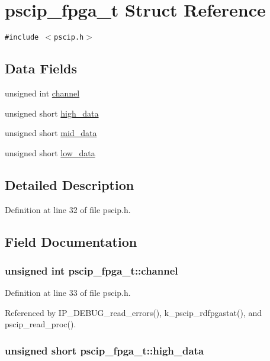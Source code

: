 \hypertarget{structpscip__fpga__t}{
\section{pscip\_\-fpga\_\-t Struct Reference}
\label{structpscip__fpga__t}
}
{\tt \#include $<$pscip.h$>$}

\subsection*{Data Fields}
\begin{CompactItemize}
\item 
unsigned int \hyperlink{structpscip__fpga__t_687f273118bfd092b2736c0a10d0a68d}{channel}
\item 
unsigned short \hyperlink{structpscip__fpga__t_4e50742f45d250be304cd21ad45814ce}{high\_\-data}
\item 
unsigned short \hyperlink{structpscip__fpga__t_89ede1d1b972a6599fee27626c83c6aa}{mid\_\-data}
\item 
unsigned short \hyperlink{structpscip__fpga__t_ab01ca33bd95494de31b58df20fd9d48}{low\_\-data}
\end{CompactItemize}


\subsection{Detailed Description}


Definition at line 32 of file pscip.h.

\subsection{Field Documentation}
\hypertarget{structpscip__fpga__t_687f273118bfd092b2736c0a10d0a68d}{
\subsubsection[{channel}]{\setlength{\rightskip}{0pt plus 5cm}unsigned int {\bf pscip\_\-fpga\_\-t::channel}}}
\label{structpscip__fpga__t_687f273118bfd092b2736c0a10d0a68d}




Definition at line 33 of file pscip.h.

Referenced by IP\_\-DEBUG\_\-read\_\-errors(), k\_\-pscip\_\-rdfpgastat(), and pscip\_\-read\_\-proc().\hypertarget{structpscip__fpga__t_4e50742f45d250be304cd21ad45814ce}{
\subsubsection[{high\_\-data}]{\setlength{\rightskip}{0pt plus 5cm}unsigned short {\bf pscip\_\-fpga\_\-t::high\_\-data}}}
\label{structpscip__fpga__t_4e50742f45d250be304cd21ad45814ce}




